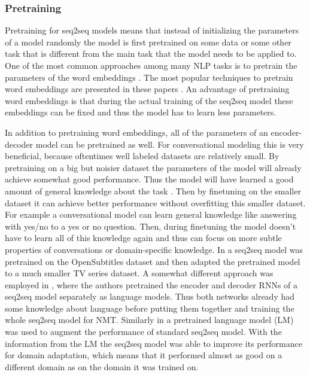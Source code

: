 \documentclass[12pt]{article}
\begin{document}
\subsubsection{Pretraining} \label{sssec:pretrain}
Pretraining for seq2seq models means that instead of initializing the parameters of a model randomly the model is first pretrained on some data or some other task that is different from the main task that the model needs to be applied to. One of the most common approaches among many NLP tasks is to pretrain the parameters of the word embeddings \cite{Chen:2014,Serban:2015,Akasaki:2017,Lample:2016,Serban:2017}. The most popular techniques to pretrain word embeddings are presented in these papers \cite{Mikolov:2013,Mikolov_skipgram:2013}. An advantage of pretraining word embeddings is that during the actual training of the seq2seq model these embeddings can be fixed and thus the model has to learn less parameters. 

In addition to pretraining word embeddings, all of the parameters of an encoder-decoder model can be pretrained as well. For conversational modeling this is very beneficial, because oftentimes well labeled datasets are relatively small. By pretraining on a big but noisier dataset the parameters of the model will already achieve somewhat good performance. Thus the model will have learned a good amount of general knowledge about the task \cite{Li:2016,Serban:2015}. Then by finetuning on the smaller dataset it can achieve better performance without overfitting this smaller dataset. For example a conversational model can learn general knowledge like answering with yes/no to a yes or no question. Then, during finetuning the model doesn't have to learn all of this knowledge again and thus can focus on more subtle properties of conversations or domain-specific knowledge. In \cite{Li:2016} a seq2seq model was pretrained on the OpenSubtitles dataset \cite{OpenSubtitles:2016} and then adapted the pretrained model to a much smaller TV series dataset. A somewhat different approach was employed in \cite{Ramachandran:2016}, where the authors pretrained the encoder and decoder RNNs of a seq2seq model separately as language models. Thus both networks already had some knowledge about language before putting them together and training the whole seq2seq model for NMT. Similarly in \cite{Sriram:2017} a pretrained language model (LM) was used to augment the performance of standard seq2seq model. With the information from the LM the seq2seq model was able to improve its performance for domain adaptation, which means that it performed almost as good on a different domain as on the domain it was trained on.
\end{document}
